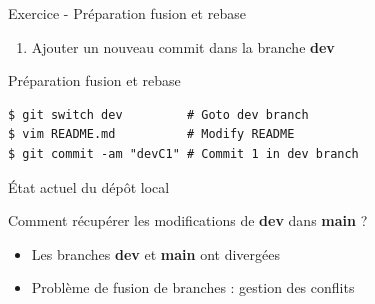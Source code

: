 \documentclass[a4paper,11pt]{beamer}
\newcounter{exampleBlockCounter}
\begin{document}
\begin{frame}[fragile]

\begin{exampleblock}{Exercice  - Préparation fusion et rebase}
\begin{enumerate}
    \item Ajouter un nouveau commit dans la branche \textbf{dev}
\end{enumerate}
\end{exampleblock}
\pause
\begin{alertblock}{Préparation fusion et rebase}
\begin{lstlisting}
$ git switch dev         # Goto dev branch
$ vim README.md          # Modify README
$ git commit -am "devC1" # Commit 1 in dev branch
\end{lstlisting}
\end{alertblock}

\end{frame}
\begin{frame}

\begin{block}{État actuel du dépôt local}
\centering


\end{block}

\begin{alertblock}{Comment récupérer les modifications de \textbf{dev} dans \textbf{main} ?}
\begin{itemize}
\item Les branches \textbf{dev} et \textbf{main} ont divergées
\item Problème de fusion de branches : gestion des conflits
\end{itemize}

\end{alertblock}
\end{frame}
\end{document}
